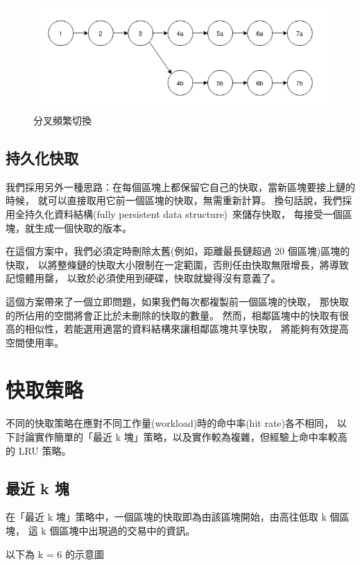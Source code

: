 \begin{figure}[h!]
\includegraphics[width=\textwidth]{快取長分叉}
\caption{分叉頻繁切換}
\end{figure}

\subsection{持久化快取}

我們採用另外一種思路：在每個區塊上都保留它自己的快取，當新區塊要接上鏈的時候，
就可以直接取用它前一個區塊的快取，無需重新計算。
換句話說，我們採用全持久化資料結構(fully persistent data structure)~\cite{driscoll1986making}來儲存快取，
每接受一個區塊，就生成一個快取的版本。

在這個方案中，我們必須定時刪除太舊(例如，距離最長鏈超過 20 個區塊)區塊的快取，
以將整條鏈的快取大小限制在一定範圍，否則任由快取無限增長，將導致記憶體用罄，
以致於必須使用到硬碟，快取就變得沒有意義了。

這個方案帶來了一個立即問題，如果我們每次都複製前一個區塊的快取，
那快取的所佔用的空間將會正比於未刪除的快取的數量。
然而，相鄰區塊中的快取有很高的相似性，若能選用適當的資料結構來讓相鄰區塊共享快取，
將能夠有效提高空間使用率。

\section{快取策略}

不同的快取策略在應對不同工作量(workload)時的命中率(hit rate)各不相同，
以下討論實作簡單的「最近 k 塊」策略，以及實作較為複雜，但經驗上命中率較高的 LRU 策略。

\subsection{最近 k 塊}

在「最近 k 塊」策略中，一個區塊的快取即為由該區塊開始，由高往低取 k 個區塊，
這 k 個區塊中出現過的交易中的資訊。

以下為 k = 6 的示意圖

